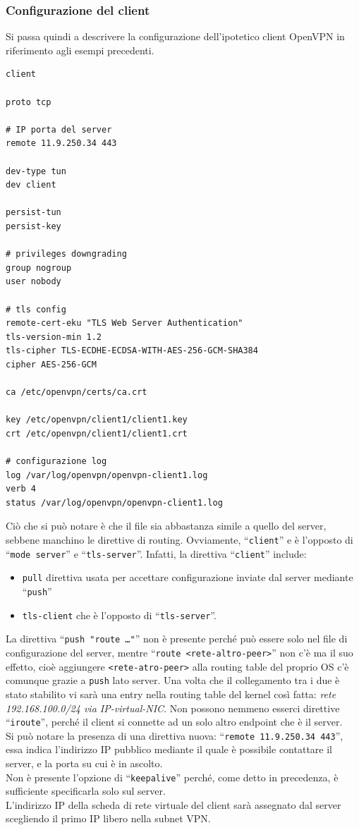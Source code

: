 \subsubsection{Configurazione del client}
Si passa quindi a descrivere la configurazione dell'ipotetico client OpenVPN in
riferimento agli esempi precedenti.
\begin{verbatim}
client
	
proto tcp
	
# IP porta del server
remote 11.9.250.34 443
	
dev-type tun
dev client
	
persist-tun
persist-key
	
# privileges downgrading
group nogroup
user nobody
	
# tls config
remote-cert-eku "TLS Web Server Authentication"
tls-version-min 1.2
tls-cipher TLS-ECDHE-ECDSA-WITH-AES-256-GCM-SHA384
cipher AES-256-GCM
	
ca /etc/openvpn/certs/ca.crt
	
key /etc/openvpn/client1/client1.key
crt /etc/openvpn/client1/client1.crt
	
# configurazione log
log /var/log/openvpn/openvpn-client1.log
verb 4
status /var/log/openvpn/openvpn-client1.log
\end{verbatim}
Ciò che si può notare è che il file sia abbastanza simile a quello del server,
sebbene manchino le direttive di routing. Ovviamente, ``\texttt{client}'' e
è l'opposto di ``\texttt{mode server}'' e
``\texttt{tls-server}''. Infatti, la direttiva ``\texttt{client}'' include:
\begin{itemize}
	\item \texttt{pull} direttiva usata per accettare configurazione inviate dal
	      server mediante ``\texttt{push}''
	\item \texttt{tls-client} che è l'opposto di ``\texttt{tls-server}''.
\end{itemize}
La direttiva ``\texttt{push "route \ldots"}''
non è presente perché può essere solo nel file di configurazione del server,
mentre ``\texttt{route <rete-altro-peer>}'' non c'è ma il suo effetto, cioè aggiungere
\texttt{<rete-atro-peer>} alla routing table del proprio OS c'è comunque grazie a \texttt{push}
lato server.
Una volta che il collegamento tra i due è stato stabilito vi sarà una entry
nella routing table del kernel così fatta: \textit{rete 192.168.100.0/24 via
	IP-virtual-NIC}. Non possono nemmeno esserci direttive ``\texttt{iroute}'', perché
il client si connette ad un solo altro endpoint che è il server.\\
Si può notare la presenza di una direttiva nuova: ``\texttt{remote 11.9.250.34 443}'',
essa indica l'indirizzo IP pubblico mediante il quale è possibile contattare
il server, e la porta su cui è in ascolto.\\
Non è presente l'opzione di ``\texttt{keepalive}'' perché, come detto in
precedenza, è sufficiente specificarla solo sul server.\\
L'indirizzo IP della scheda di rete virtuale del client sarà assegnato dal server scegliendo
il primo IP libero nella subnet VPN.


